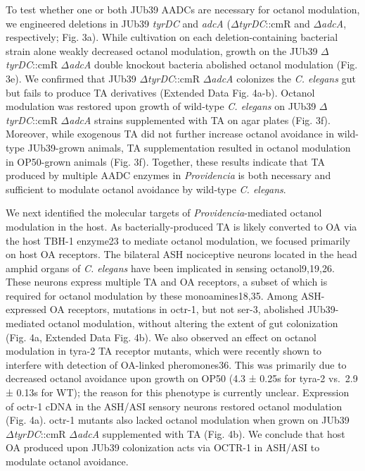 \documentclass[]{article}
\begin{document}
To test whether one or both JUb39 AADCs are necessary for octanol
modulation, we engineered deletions in JUb39 \textit{tyrDC} and
\textit{adcA} (\(\Delta\)\textit{tyrDC}::cmR and
\(\Delta\)\textit{adcA}, respectively; Fig. 3a). While cultivation on
each deletion-containing bacterial strain alone weakly decreased octanol
modulation, growth on the JUb39 \(\Delta\)\textit{tyrDC}::cmR
\(\Delta\)\textit{adcA} double knockout bacteria abolished octanol
modulation (Fig. 3e). We confirmed that JUb39
\(\Delta\)\textit{tyrDC}::cmR \(\Delta\)\textit{adcA} colonizes the
\textit{C. elegans} gut but fails to produce TA derivatives (Extended
Data Fig. 4a-b). Octanol modulation was restored upon growth of
wild-type \textit{C. elegans} on JUb39 \(\Delta\)\textit{tyrDC}::cmR
\(\Delta\)\textit{adcA} strains supplemented with TA on agar plates
(Fig. 3f). Moreover, while exogenous TA did not further increase octanol
avoidance in wild-type JUb39-grown animals, TA supplementation resulted
in octanol modulation in OP50-grown animals (Fig. 3f). Together, these
results indicate that TA produced by multiple AADC enzymes in
\textit{Providencia} is both necessary and sufficient to modulate
octanol avoidance by wild-type \textit{C. elegans}.

We next identified the molecular targets of
\textit{Providencia}-mediated octanol modulation in the host. As
bacterially-produced TA is likely converted to OA via the host TBH-1
enzyme23 to mediate octanol modulation, we focused primarily on host OA
receptors. The bilateral ASH nociceptive neurons located in the head
amphid organs of \textit{C. elegans} have been implicated in sensing
octanol9,19,26. These neurons express multiple TA and OA receptors, a
subset of which is required for octanol modulation by these
monoamines18,35. Among ASH-expressed OA receptors, mutations in octr-1,
but not ser-3, abolished JUb39-mediated octanol modulation, without
altering the extent of gut colonization (Fig. 4a, Extended Data Fig.
4b). We also observed an effect on octanol modulation in tyra-2 TA
receptor mutants, which were recently shown to interfere with detection
of OA-linked pheromones36. This was primarily due to decreased octanol
avoidance upon growth on OP50 (4.3 ± 0.25s for tyra-2 vs.~2.9 ± 0.13s
for WT); the reason for this phenotype is currently unclear. Expression
of octr-1 cDNA in the ASH/ASI sensory neurons restored octanol
modulation (Fig. 4a). octr-1 mutants also lacked octanol modulation when
grown on JUb39 \(\Delta\)\textit{tyrDC}::cmR \(\Delta\)\textit{adcA}
supplemented with TA (Fig. 4b). We conclude that host OA produced upon
JUb39 colonization acts via OCTR-1 in ASH/ASI to modulate octanol
avoidance.
\end{document}

